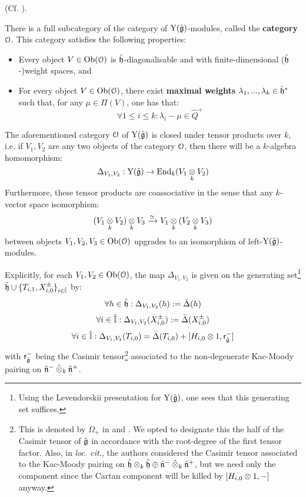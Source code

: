         \begin{lemma} \label{lemma: category_O_affine_yangian}
            (Cf. \cite[Theorem 4.9]{guay_nakajima_wendlandt_affine_yangian_coproduct}).
        
            There is a full subcategory of the category of $\mathrm{Y}(\hat{\mathfrak{g}})$-modules, called the \textbf{category $\mathcal{O}$}. This category satisfies the following properties:
            \begin{itemize}
                \item Every object $V \in \mathrm{Ob}(\mathcal{O})$ is $\hat{\mathfrak{h}}$-diagonalisable and with finite-dimensional ($\hat{\mathfrak{h}}$-)weight spaces, and
                \item For every object $V \in \mathrm{Ob}(\mathcal{O})$, there exist \textbf{maximal weights} $\lambda_1, ..., \lambda_k \in \hat{\mathfrak{h}}^*$ such that, for any $\mu \in \Pi(V)$, one has that:
                    $$\forall 1 \leq i \leq k: \lambda_i - \mu \in \hat{Q}^+$$
            \end{itemize}

            The aforementioned category $\mathcal{O}$ of $\mathrm{Y}(\hat{\mathfrak{g}})$ is closed under tensor products over $k$, i.e. if $V_1, V_2$ are any two objects of the category $\mathcal{O}$, then there will be a $k$-algebra homomorphism:
                $$\Delta_{V_1, V_2}: \rmY(\hat{\g}) \to \End_k(V_1 \tensor_k V_2)$$
            Furthermore, these tensor products are coassociative in the sense that any $k$-vector space isomorphism:
                $$(V_1 \tensor_k V_2) \tensor_k V_3 \xrightarrow[]{\cong} V_1 \tensor_k (V_2 \tensor_k V_3)$$
            between objects $V_1, V_2, V_3 \in \mathrm{Ob}(\mathcal{O})$ upgrades to an isomorphism of left-$\mathrm{Y}(\hat{\mathfrak{g}})$-modules.

            Explicitly, for each $V_1, V_2 \in \mathrm{Ob}(\mathcal{O})$, the map $\Delta_{V_1, V_2}$ is given on the generating set\footnote{Using the Levendorskii presentation for $\mathrm{Y}(\hat{\mathfrak{g}})$, one sees that this generating set suffices.} $\hat{\mathfrak{h}} \cup \{T_{i, 1}, X_{i, 0}^{\pm}\}_{i \in \hat{\mathbb{I}}}$ by:
                $$\forall h \in \hat{\mathfrak{h}}: \Delta_{V_1, V_2}(h) := \bar{\Delta}(h)$$
                $$\forall i \in \hat{\mathbb{I}}: \Delta_{V_1, V_2}(X_{i, 0}^{\pm}) := \bar{\Delta}(X_{i, 0}^{\pm})$$
                $$\forall i \in \hat{\simpleroots}: \Delta_{V_1, V_2}(T_{i, 0}) = \bar{\Delta}(T_{i, 0}) + [H_{i, 0} \tensor 1, \sfr_{ \hat{\g} }^-]$$
            with $\mathsf{r}_{ \hat{\mathfrak{g}} }^-$ being the Casimir tensor\footnote{This is denoted by $\Omega_+$ in \cite{guay_nakajima_wendlandt_affine_yangian_coproduct} and \cite{guay_nakajima_wendlandt_affine_yangian_vertex_representations_and_PBW}. We opted to designate this the  half of the Casimir tensor of $\hat{\mathfrak{g}}$ in accordance with the root-degree of the first tensor factor. Also, in \textit{loc. cit.}, the authors considered the Casimir tensor associated to the Kac-Moody pairing on $\hat{\h} \tensor_k \hat{\h} \oplus \hat{\n}^- \hattensor_k \hat{\n}^+$, but we need only the  component since the Cartan component will be killed by $[H_{i, 0} \tensor 1, -]$ anyway.} associated to the non-degenerate Kac-Moody pairing on $\hat{\n}^- \hattensor_k \hat{\n}^+$.
        \end{lemma}
